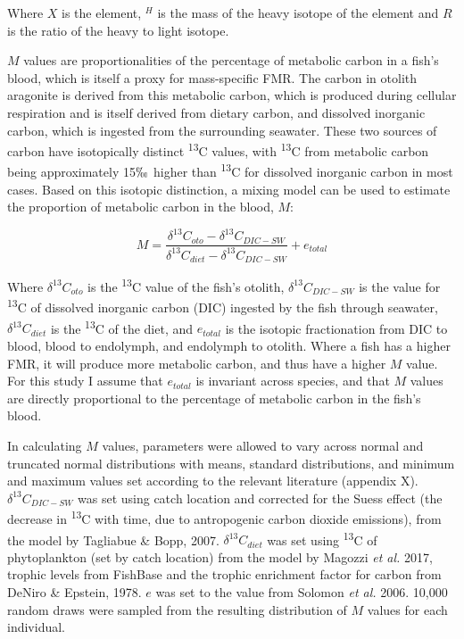 \documentclass[12pt, titlepage]{article}
\begin{document}
Where $X$ is the element, $^{H}$ is the mass of the heavy isotope of the element and $R$ is the ratio of the heavy to light isotope. %

$M$ values are proportionalities of the percentage of metabolic carbon in a fish's blood, which is itself a proxy for mass-specific FMR.
The carbon in otolith aragonite is derived from this metabolic carbon, which is produced during cellular respiration and is itself derived from dietary carbon, and dissolved inorganic carbon, which is ingested from the surrounding seawater.
These two sources of carbon have isotopically distinct \textdelta \textsuperscript{13}C values, with \textdelta \textsuperscript{13}C from metabolic carbon being approximately 15$\permil$ higher than \textdelta \textsuperscript{13}C for dissolved inorganic carbon in most cases. %
Based on this isotopic distinction, a mixing model can be used to estimate the proportion of metabolic carbon in the blood, $M$:

\begin{equation}
M = \frac{\delta^{13}C_{oto}-\delta^{13}C_{DIC-SW}}{\delta^{13}C_{diet}-\delta^{13}C_{DIC-SW}} + e_{total}
\end{equation}

\noindent Where $\delta^{13}C_{oto}$ is the \textdelta \textsuperscript{13}C value of the fish's otolith, $\delta^{13}C_{DIC-SW}$ is the value for \textdelta \textsuperscript{13}C of dissolved inorganic carbon (DIC) ingested by the fish through seawater, $\delta^{13}C_{diet}$ is the \textdelta \textsuperscript{13}C of the diet, and $e_{total}$ is the isotopic fractionation from DIC to blood, blood to endolymph, and endolymph to otolith. 
Where a fish has a higher FMR, it will produce more metabolic carbon, and thus have a higher $M$ value. 
For this study I assume that $e_{total}$ is invariant across species, and that $M$ values are directly proportional to the percentage of metabolic carbon in the fish's blood.

In calculating $M$ values, parameters were allowed to vary across normal and truncated normal distributions with means, standard distributions, and minimum and maximum values set according to the relevant literature (appendix X). %
$\delta^{13}C_{DIC-SW}$ was set using catch location and corrected for the Suess effect (the decrease in \textdelta \textsuperscript{13}C with time, due to antropogenic carbon dioxide emissions), from the model by Tagliabue \& Bopp, 2007.
$\delta^{13}C_{diet}$ was set using \textdelta \textsuperscript{13}C of phytoplankton (set by catch location) from the model by Magozzi \textit{et al.} 2017, trophic levels from FishBase and the trophic enrichment factor for carbon from DeNiro \& Epstein, 1978.
$e$ was set to the value from Solomon \textit{et al.} 2006.
10,000 random draws were sampled from the resulting distribution of $M$ values for each individual.
\end{document}
